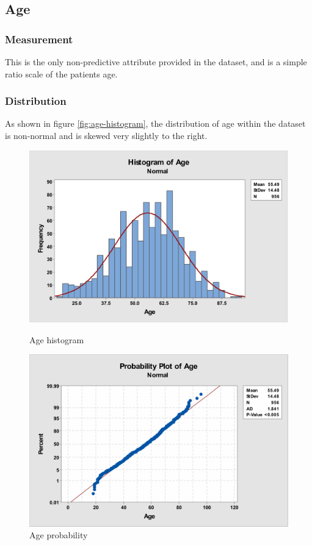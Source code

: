 \documentclass[12pt]{article}
\begin{document}
    \subsection{Age}
      \subsubsection{Measurement}
        This is the only non-predictive attribute provided in the dataset, and is a simple ratio scale of the patients age.

      \subsubsection{Distribution}
        As shown in figure \ref{fig:age-histogram}, the distribution of age within the dataset is non-normal and is skewed very slightly to the right.

        \begin{figure}[H]
          \centering
          \begin{minipage}[b]{0.45\textwidth}
            \includegraphics[width=\textwidth]{age-histogram}
            \caption{Age histogram}
            \label{fig:age-histogram}
          \end{minipage}
          \hfill
          \begin{minipage}[b]{0.45\textwidth}
            \includegraphics[width=\textwidth]{age-probability}
            \caption{Age probability}
            \label{fig:age-probability}
          \end{minipage}
        \end{figure}
\end{document}
